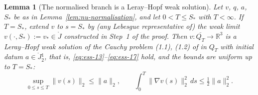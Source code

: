 \documentclass[11pt]{article}
\newtheorem{lemma}[theorem]{Lemma}
\theoremstyle{definition}
\theoremstyle{plain}
\newcommand{\R}{\mathbb R}
\newcommand{\norm}[1]{\lVert #1\rVert}
\begin{document}
\begin{lemma}[The normalised branch is a Leray--Hopf weak solution]
\label{lem:leray-hopf}
Let $v$, $q$, $a$, $S_*$ be as in Lemma~\ref{lem:nu-normalisation}, and let
$0<T\leq S_*$ with $T<\infty$.  If $T=S_*$, extend $v$ to $s=S_*$ by (any
Lebesgue representative of) the weak limit $v(\cdot,S_*):=v_*\in\mathring J$
constructed in Step~1 of the proof.
Then $v\colon\overline{Q_T}\to\R^3$ is a Leray--Hopf weak solution of the
Cauchy problem (1.1), (1.2) of \cite{ESS2003} in $Q_T$ with initial datum
$a\in\mathring J{}^1_2$, that is, \eqref{eq:ess-13}--\eqref{eq:ess-17} hold,
and the bounds are uniform up to $T=S_*$:
\[
 \sup_{0\leq s\leq T}\norm{v(s)}_2\leq\norm a_2,\qquad
 \int_0^T\norm{\nabla v(s)}_2^2\,ds\leq\tfrac12\norm a_2^2 .
\]
\end{lemma}
\end{document}
